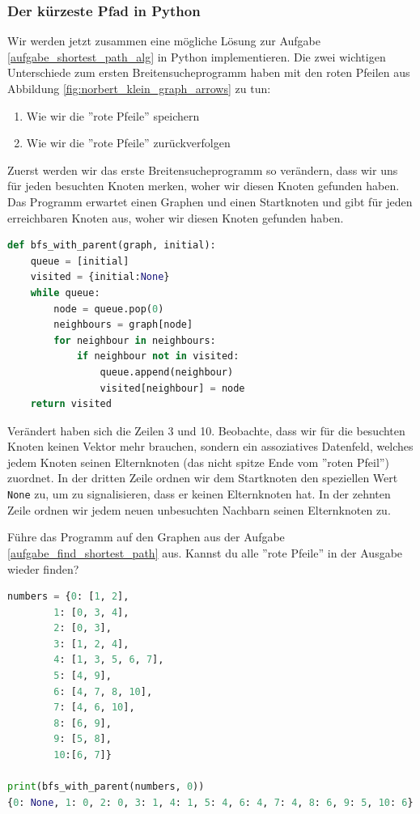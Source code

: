 \subsubsection*{Der kürzeste Pfad in Python}
Wir werden jetzt zusammen eine mögliche Lösung zur Aufgabe \ref{aufgabe_shortest_path_alg} in Python implementieren. Die zwei wichtigen Unterschiede zum ersten Breitensucheprogramm haben mit den roten Pfeilen aus Abbildung \ref{fig:norbert_klein_graph_arrows} zu tun:
\begin{enumerate}
    \item Wie wir die ''rote Pfeile'' speichern
    \item Wie wir die ''rote Pfeile'' zurückverfolgen
\end{enumerate}

Zuerst werden wir das erste Breitensucheprogramm so verändern, dass wir uns für jeden besuchten Knoten merken, woher wir diesen Knoten gefunden haben. Das Programm erwartet einen Graphen und einen Startknoten und gibt für jeden erreichbaren Knoten aus, woher wir diesen Knoten gefunden haben.

\begin{lstlisting}[language=Python, caption={Programm, welches die ''rote Pfeile'' ausgehend von einem Startknoten berechnet und ausgibt. Die einzigen zwei Zeilen, die sich verändert haben, sind 3 und 10.}, label={bfs_with_parent}]
def bfs_with_parent(graph, initial):
    queue = [initial]
    visited = {initial:None}
    while queue:
        node = queue.pop(0)
        neighbours = graph[node]
        for neighbour in neighbours:
            if neighbour not in visited:
                queue.append(neighbour)
                visited[neighbour] = node
    return visited
\end{lstlisting}
Verändert haben sich die Zeilen 3 und 10. Beobachte, dass wir für die besuchten Knoten keinen Vektor mehr brauchen, sondern ein assoziatives Datenfeld, welches jedem Knoten seinen Elternknoten (das nicht spitze Ende vom ''roten Pfeil'') zuordnet. In der dritten Zeile ordnen wir dem Startknoten den speziellen Wert \texttt{None} zu, um zu signalisieren, dass er keinen Elternknoten hat. In der zehnten Zeile ordnen wir jedem neuen unbesuchten Nachbarn seinen Elternknoten zu.

Führe das Programm auf den Graphen aus der Aufgabe \ref{aufgabe_find_shortest_path} aus. Kannst du alle ''rote Pfeile'' in der Ausgabe wieder finden?
\begin{lstlisting}[language=Python]
numbers = {0: [1, 2],
        1: [0, 3, 4],
        2: [0, 3],
        3: [1, 2, 4],
        4: [1, 3, 5, 6, 7],
        5: [4, 9],
        6: [4, 7, 8, 10],
        7: [4, 6, 10],
        8: [6, 9],
        9: [5, 8],
        10:[6, 7]}

print(bfs_with_parent(numbers, 0))
{0: None, 1: 0, 2: 0, 3: 1, 4: 1, 5: 4, 6: 4, 7: 4, 8: 6, 9: 5, 10: 6}
\end{lstlisting}

